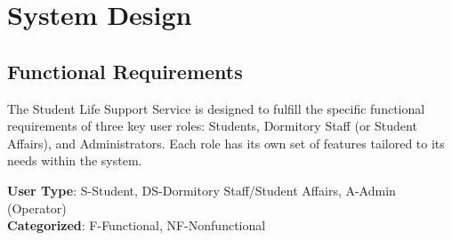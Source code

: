 \section{System Design}

\subsection{Functional Requirements}
The Student Life Support Service is designed to fulfill the specific functional requirements of three key user roles: Students, Dormitory Staff (or Student Affairs), and Administrators. Each role has its own set of features tailored to its needs within the system.

\noindent \textbf{User Type}: S-Student, DS-Dormitory Staff/Student Affairs, A-Admin (Operator) \\
\textbf{Categorized}: F-Functional, NF-Nonfunctional


